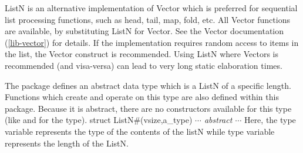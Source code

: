 ListN is an alternative implementation of Vector which is
preferred for sequential list processing functions, such as head, tail, map,
fold, etc.  All Vector functions are available, by substituting
ListN for Vector.  See the Vector documentation (\ref{lib-vector})
for details.  If the implementation requires random access to
items in the list, the Vector construct is recommended.  Using
ListN where Vectors is recommended (and visa-versa) can lead to
very long static elaboration times. 

The {}  package defines an abstract data type which is
a ListN of a specific length.  Functions which create and operate
on this type are also defined within this package.
Because it is abstract, there are no constructors available for this type
(like {} and {} for the {} type).
\BBS
 struct ListN\#(vsize,a\_type) 
       {\rm{\emph{$\cdots$ abstract $\cdots$}}}
\EBS
Here, the type variable {} represents the type of the
contents of the listN 
while type variable {} represents the length of the
ListN.
